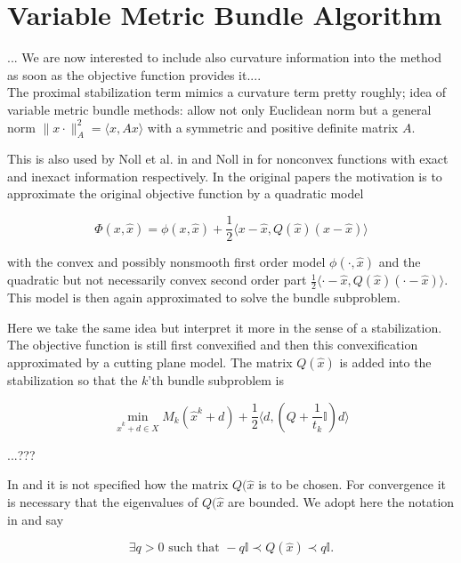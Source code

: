 \section{Variable Metric Bundle Algorithm}
\label{variable_metric}

...
We are now interested to include also curvature information into the method as soon as the objective function provides it.... \\

The proximal stabilization term mimics a curvature term pretty roughly; idea of variable metric bundle methods: allow not only Euclidean norm but a general norm \(\|x\cdot\|^2_{A} = \langle x,Ax\rangle\) with a symmetric and positive definite matrix \(A\).

This is also used by Noll et al. in \cite{Noll2012} and Noll in \cite{Noll2013} for nonconvex functions with exact and inexact information respectively.
In the original papers the motivation is to approximate the original objective function by a quadratic model

\begin{equation}
	\Phi(x,\hat{x}) = \phi(x,\hat{x})+\frac{1}{2}\langle x-\hat{x},Q(\hat{x})(x-\hat{x})\rangle
\end{equation}

with the convex and possibly nonsmooth first order model \(\phi(\cdot,\hat{x})\) and the quadratic but not necessarily convex second order part \(\frac{1}{2}\langle \cdot-\hat{x},Q(\hat{x})(\cdot-\hat{x})\rangle\).
This model is then again approximated to solve the bundle subproblem.

Here we take the same idea but interpret it more in the sense of a stabilization. The objective function is still first convexified and then this convexification approximated by a cutting plane model. The matrix \(Q(\hat{x})\) is added into the stabilization so that the \(k\)'th bundle subproblem is

\begin{equation}
	\min_{\hat{x}^k+d \in X} M_k(\hat{x}^k+d) + \frac{1}{2}\langle d,\left(Q+\frac{1}{t_k}\mathbb{I} \right) d \rangle
\end{equation}

...???


In \cite{Noll2012} and \cite{Noll2013} it is not specified how the matrix \(Q(\hat{x}\) is to be chosen.
For convergence it is necessary that the eigenvalues of \(Q(\hat{x}\) are bounded. We adopt here the notation in \cite{Noll2013} and say

\begin{equation}
	\exists q > 0 \text{ such that } -q\mathbb{I} \prec Q(\hat{x}) \prec q\mathbb{I}.
\end{equation}

